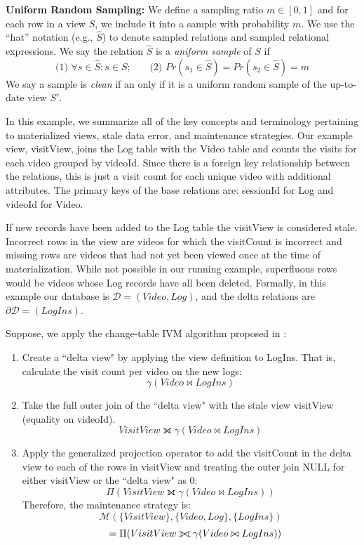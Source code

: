 \vspace{0.45em}
\fi

\noindent \textbf{Uniform Random Sampling: }
We define a sampling ratio $m\in [0,1]$ and for each row in a view $S$, we include it into a sample with probability $m$.
We use the ``hat'' notation (e.g., $\widehat{S}$) to denote sampled relations and sampled relational expressions.
We say the relation $\widehat{S}$ is a \emph{uniform sample} of $S$ if
\[\text{(1) } \forall s \in \widehat{S} : s \in S\text{;~~~~~ (2) }Pr(s_1 \in \widehat{S}) =  Pr(s_2 \in \widehat{S}) = m\]
We say a sample is \emph{clean} if an only if it is a uniform random sample of the up-to-date view $S'$. 

\vspace{0.25em}

\begin{example}\label{concepts}
In this example, we summarize all of the key concepts and terminology pertaining to materialized views, stale data error, and maintenance strategies.
Our example view, visitView, joins the Log table with the Video table and counts the visits for each video grouped by videoId.
Since there is a foreign key relationship between the relations, this is just a visit count for each unique video with additional attributes. 
The primary keys of the base relations are: sessionId for Log and videoId for Video.

If new records have been added to the Log table the visitView is considered stale.
Incorrect rows in the view are videos for which the visitCount is incorrect and missing rows are videos that had not yet been viewed once at the time of materialization. 
While not possible in our running example, superfluous rows would be videos whose Log records have all been deleted.
Formally, in this example our database is $\mathcal{D}=(Video, Log)$, and the delta relations are $\partial\mathcal{D}=(LogIns)$. 

Suppose, we apply the change-table IVM algorithm proposed in \cite{gupta1995maintenance}:
\vspace{-.55em}
\begin{enumerate}[noitemsep]
\item Create a ``delta view" by applying the view definition to LogIns. That is, calculate the visit count per video on the new logs:
\[
 \gamma(Video \bowtie LogIns)
\]
\item Take the full outer join of the ``delta view" with the stale view visitView (equality on videoId).
\[
 VisitView \fullouterjoin \gamma(Video \bowtie LogIns)
\]
\item Apply the generalized projection operator to add the visitCount in the delta view to each of the rows in visitView and treating the outer join NULL for either visitView or the ``delta view" as 0:
\[
 \Pi (VisitView \fullouterjoin \gamma(Video \bowtie LogIns))
\]
Therefore, the maintenance strategy is:
\[
 \mathcal{M}(\{VisitView\},\{Video, Log\}, \{LogIns\})
\]
\[
\text{\hspace{0.7em}} = \Pi (VisitView \fullouterjoin \gamma(Video \bowtie LogIns))
\]
\end{enumerate}

\end{example}

